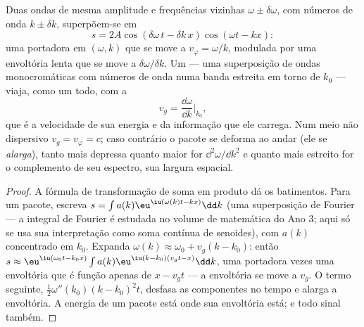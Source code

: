 \begin{proposition}\label{prop:b2:dispersion-wave-packets:group}
Duas ondas de mesma amplitude e frequências vizinhas $\omega \pm
\delta\omega$, com números de onda $k \pm \delta k$, superpõem-se em
\[
s = 2A\cos(\delta\omega\,t - \delta k\,x)\cos(\omega t - kx) :
\]
uma portadora em $(\omega, k)$ que se move a $v_\varphi = \omega/k$, modulada por uma
envoltória lenta que se move a $\delta\omega/\delta k$. Um \emph{} --- uma
superposição de ondas monocromáticas com números de onda numa banda estreita
em torno de $k_0$ --- viaja, como um todo, com a \emph{}
\[
v_g = \frac{\dd\omega}{\dd k}\Bigr|_{k_0} ,
\]
que é a velocidade de sua energia e da informação que ele carrega.
Num meio não dispersivo $v_g = v_\varphi = c$; caso contrário o pacote
se deforma ao andar (ele se \emph{alarga}), tanto mais depressa quanto maior for
$\dd^2\omega/\dd k^2$ e quanto mais estreito for o complemento de seu espectro, sua
largura espacial.
\end{proposition}

\begin{proof}
A fórmula de transformação de soma em produto dá os batimentos. Para um pacote, escreva $s =
\int a(k)\eu^{\iu(\omega(k)t - kx)}\dd k$ (uma superposição de Fourier --- a
integral de Fourier é estudada no volume de matemática do Ano 3; aqui só
se usa sua interpretação como soma contínua de senoides), com
$a(k)$ concentrado em $k_0$. Expanda $\omega(k) \approx \omega_0 + v_g(k - k_0)$: então
$s \approx \eu^{\iu(\omega_0t - k_0x)}\int a(k)\eu^{\iu(k - k_0)(v_gt - x)}\dd k$, uma
portadora vezes uma envoltória que é função apenas de $x - v_gt$ --- a
envoltória se move a $v_g$. O termo seguinte, $\tfrac12\omega''(k_0)(k - k_0)^2t$,
desfasa as componentes no tempo e alarga a envoltória. A energia
de um pacote está onde sua envoltória está; e todo sinal também.
\end{proof}

